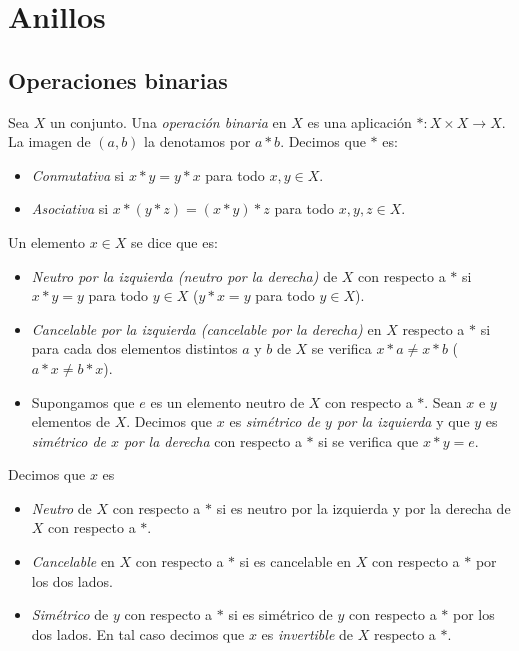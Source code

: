 \chapter{Anillos}

\section{Operaciones binarias}

Sea $X$ un conjunto. Una {\it operación binaria} en $X$ es una aplicación $*:X\times X\rightarrow X$. La imagen de $(a,b)$ la denotamos por $a*b$. Decimos que $*$ es:
\begin{itemize}
    \item {\it Conmutativa} si $x*y=y*x$ para todo $x,y \in X$.
    \item {\it Asociativa} si $x*(y*z)=(x*y)*z$ para todo $x,y,z \in X$.
\end{itemize}

Un elemento $x\in X$ se dice que es:
\begin{itemize}
    \item {\it Neutro por la izquierda (neutro por la derecha)} de $X$ con respecto a $*$ si $x*y = y$ para todo $y\in X$ ($y*x=y$ para todo $y\in X$).
    \item {\it Cancelable por la izquierda (cancelable por la derecha)} en $X$ respecto a $*$ si para cada dos elementos distintos $a$ y $b$ de $X$ se verifica $x*a\neq x*b$ ($a*x\neq b*x$).
    \item Supongamos que $e$ es un elemento neutro de $X$ con respecto a $*$. Sean $x$ e $y$ elementos de $X$. Decimos que $x$ es {\it simétrico de $y$ por la izquierda} y que $y$ es {\it simétrico de $x$ por la derecha} con respecto a $*$ si se verifica que $x*y=e$.
\end{itemize}

Decimos que $x$ es
\begin{itemize}
    \item {\it Neutro} de $X$ con respecto a $*$ si es neutro por la izquierda y por la derecha de $X$ con respecto a $*$.
    \item {\it Cancelable} en $X$ con respecto a $*$ si es cancelable en $X$ con respecto a $*$ por los dos lados.
    \item {\it Simétrico} de $y$ con respecto a $*$ si es simétrico de $y$ con respecto a $*$ por los dos lados. En tal caso decimos que $x$ es {\it invertible} de $X$ respecto a $*$.
\end{itemize}

